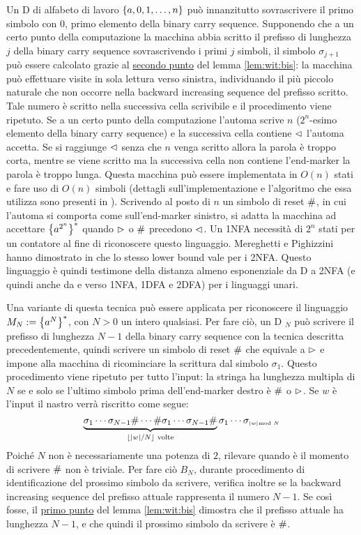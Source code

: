 Un D di alfabeto di lavoro $\left\{ a,0,1,\dots,n \right\}$ può innanzitutto sovrascrivere il primo simbolo con $0$, primo elemento della binary carry sequence. Supponendo che a un certo punto della computazione la macchina abbia scritto il prefisso di lunghezza $j$ della binary carry sequence sovrascrivendo i primi $j$ simboli, il simbolo $\sigma_{j+1}$ può essere calcolato grazie al \hyperref[lem:wit:bis:2]{secondo punto} del lemma \ref{lem:wit:bis}: la macchina può effettuare visite in sola lettura verso sinistra, individuando il più piccolo naturale che non occorre nella backward increasing sequence del prefisso scritto. Tale numero è scritto nella successiva cella scrivibile e il procedimento viene ripetuto. Se a un certo punto della computazione l'automa scrive $n$ ($2^n$-esimo elemento della binary carry sequence) e la successiva cella contiene $\lhd$ l'automa accetta. Se si raggiunge $\lhd$ senza che $n$ venga scritto allora la parola è troppo corta, mentre se viene scritto ma la successiva cella non contiene l'end-marker la parola è troppo lunga. Questa macchina può essere implementata in $O(n)$ stati e fare uso di $O(n)$ simboli (dettagli sull'implementazione e l'algoritmo che essa utilizza sono presenti in \cite{Pighizzini:19:limitedunary}). Scrivendo al posto di $n$ un simbolo di reset $\#$, in cui l'automa si comporta come sull'end-marker sinistro, si adatta la macchina ad accettare $\left\{ a^{2^n} \right\}^*$ quando $\rhd$ o $\#$ precedono $\lhd$. Un 1NFA necessità di $2^n$ stati per un contatore al fine di riconoscere questo linguaggio. Mereghetti e Pighizzini hanno dimostrato in \cite{Mereghetti:00:twoway} che lo stesso lower bound vale per i 2NFA. Questo linguaggio è quindi testimone della distanza almeno esponenziale da D a 2NFA (e quindi anche da  e verso 1NFA, 1DFA e 2DFA) per i linguaggi unari.

Una variante di questa tecnica può essere applicata per riconoscere il linguaggio $M_N:=\left\{ a^N \right\}^*$, con $N>0$ un intero qualsiasi. Per fare ciò, un D $_N$ può scrivere il prefisso di lunghezza $N-1$ della binary carry sequence con la tecnica descritta precedentemente, quindi scrivere un simbolo di reset $\#$ che equivale a $\rhd$ e impone alla macchina di ricominciare la scrittura dal simbolo $\sigma_1$. Questo procedimento viene ripetuto per tutto l'input: la stringa ha lunghezza multipla di $N$ se e solo se l'ultimo simbolo prima dell'end-marker destro è $\#$ o $\rhd$. Se $w$ è l'input il nastro verrà riscritto come segue:
\begin{equation*}
	\underbrace{\sigma_1\cdots\sigma_{N-1}\#\cdots\#\sigma_1\cdots\sigma_{N-1}\#}_{\lfloor |w|/N \rfloor \text{ volte}}\sigma_1\cdots\sigma_{\scriptscriptstyle |w|\mkern -11mu \mod N}
\end{equation*}
Poiché $N$ non è necessariamente una potenza di $2$, rilevare quando è il momento di scrivere $\#$ non è triviale. Per fare ciò $B_N$, durante procedimento di identificazione del prossimo simbolo da scrivere, verifica inoltre se la backward increasing sequence del prefisso attuale rappresenta il numero $N-1$. Se così fosse, il \hyperref[lem:wit:bis:1]{primo punto} del lemma \ref{lem:wit:bis} dimostra che il prefisso attuale ha lunghezza $N-1$, e che quindi il prossimo simbolo da scrivere è $\#$.


